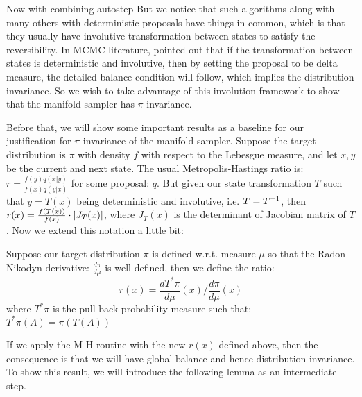 \documentclass{article}
\begin{document}
Now with combining autostep But we notice that such algorithms along with many others with deterministic proposals have things in common, which is that they usually have involutive transformation between states to satisfy the reversibility. In MCMC literature, \cite{tierney1998} pointed out that if the transformation between states is deterministic and involutive, then by setting the proposal to be delta measure, the detailed balance condition will follow, which implies the distribution invariance. So we wish to take advantage of this involution framework to show that the manifold sampler has $\pi$ invariance.

Before that, we will show some important results as a baseline for our justification for $\pi$ invariance of the manifold sampler. Suppose the target distribution is $\pi$ with density $f$ with respect to the Lebesgue measure, and let $x, y$ be the current and next state. The usual Metropolis-Hastings ratio is: $r = \frac{f(y) q(x | y)}{f(x) q(y | x)}$ for some proposal: $q$. But given our state transformation $T$ such that $y = T(x)$ being deterministic and involutive, i.e. $T = T^{-1}$, then $r(x) = \frac{f(T(x))}{f(x)} \cdot \left|J_T(x)\right|$, where $J_T(x)$ is the determinant of Jacobian matrix of $T$. Now we extend this notation a little bit:

Suppose our target distribution $\pi$ is defined w.r.t. measure $\mu$ so that the Radon-Nikodyn derivative: $\frac{d\pi}{d\mu}$ is well-defined, then we define the ratio: \[r(x) = \frac{d T^*\pi}{d\mu}(x) / \frac{d\pi}{d\mu}(x)\]where $T^*\pi$ is the pull-back probability measure such that: $T^*\pi(A) = \pi(T(A))$

If we apply the M-H routine with the new $r(x)$ defined above, then the consequence is that we will have global balance and hence distribution invariance. To show this result, we will introduce the following lemma as an intermediate step.


\end{document}
